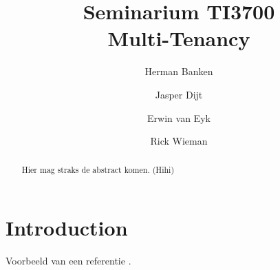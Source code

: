 \documentclass{article}
\title{Seminarium TI3700\\ Multi-Tenancy}
\author{Herman Banken\and
    Jasper Dijt\and
    Erwin van Eyk\and
    Rick Wieman}
\date{}
\begin{document}
\maketitle
\thispagestyle{empty}

\begin{abstract}
Hier mag straks de abstract komen. (Hihi)
\end{abstract}


\section{Introduction}

Voorbeeld van een referentie \cite{bezemer2010multi}.



\end{document}
